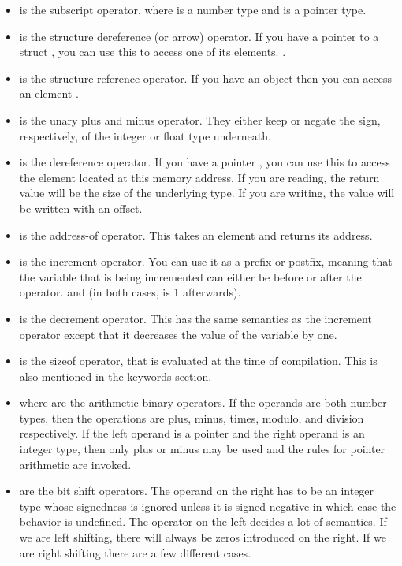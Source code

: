 \begin{itemize}
	\item \keyword{[]} is the subscript operator.  where  is a number type and  is a pointer type.
	\item \keyword{->} is the structure dereference (or arrow) operator. If you have a pointer to a struct , you can use this to access one of its elements. .
	\item {} is the structure reference operator. If you have an object  then you can access an element .
	\item {} is the unary plus and minus operator. They either keep or negate the sign, respectively, of the integer or float type underneath.
	\item {} is the dereference operator. If you have a pointer , you can use this to access the element located at this memory address. If you are reading, the return value will be the size of the underlying type. If you are writing, the value will be written with an offset.
	\item {} is the address-of operator. This takes an element and returns its address.
	\item \keyword{++} is the increment operator. You can use it as a prefix or postfix, meaning that the variable that is being incremented can either be before or after the operator.  and  (in both cases,  is 1 afterwards).
	\item \keyword{-{}-} is the decrement operator. This has the same semantics as the increment operator except that it decreases the value of the variable by one.
	\item {} is the sizeof operator, that is evaluated at the time of compilation. This is also mentioned in the keywords section.
	\item {} where  are the arithmetic binary operators. If the operands are both number types, then the operations are plus, minus, times, modulo, and division respectively. If the left operand is a pointer and the right operand is an integer type, then only plus or minus may be used and the rules for pointer arithmetic are invoked.
	\item \keyword{>>/<<} are the bit shift operators. The operand on the right has to be an integer type whose signedness is ignored unless it is signed negative in which case the behavior is undefined. The operator on the left decides a lot of semantics. If we are left shifting, there will always be zeros introduced on the right. If we are right shifting there are a few different cases.

\end{itemize}
